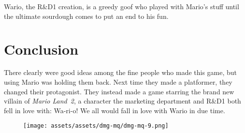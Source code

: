 \documentclass{book}
\begin{document}
Wario, the R\&D1 creation, is a greedy goof who played with Mario’s stuff until the ultimate sourdough comes to put an end to his fun.

\FloatBarrier\needspace{10mm}\section*{Conclusion}\nopagebreak[4]

There clearly were good ideas among the fine people who made this game, but using Mario was holding them back. Next time they made a platformer, they changed their protagonist. They instead made a game starring the brand new villain of \emph{Mario Land 2}, a character the marketing department and R\&D1 both fell in love with: Wa-ri-o! We all would fall in love with Wario in due time.

\begin{figure}[hbt]
\vskip 10pt
\centering \texttt{[image: assets/assets/dmg-mq/dmg-mq-9.png]}
\vskip 6pt
\end{figure}
\end{document}
